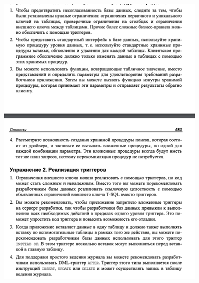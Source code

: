 \begin{figure}[h!]
	\begin{center}
		\includegraphics[width=0.9\textwidth]{img/eans30.png}
	\end{center}
	\captionsetup{justification=centering}
\end{figure}